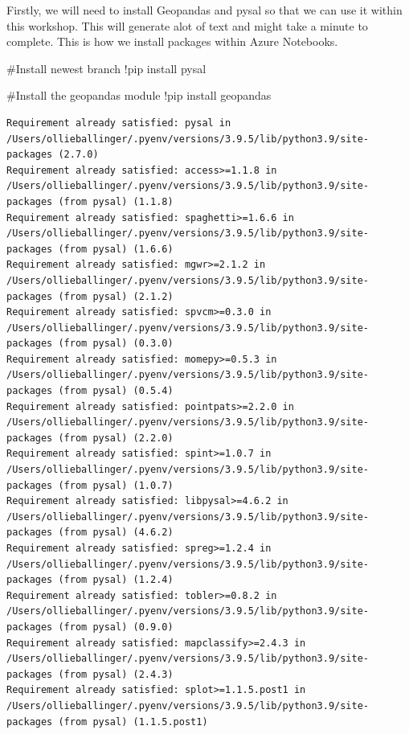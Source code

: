\documentclass[
  letterpaper,
  DIV=11,
  numbers=noendperiod]{scrreprt}
\newenvironment{Shaded}{\begin{snugshade}}{\end{snugshade}}
\newcommand{\CommentTok}[1]{\textcolor[rgb]{0.37,0.37,0.37}{#1}}
\newcommand{\NormalTok}[1]{\textcolor[rgb]{0.00,0.23,0.31}{#1}}
\newcommand{\OperatorTok}[1]{\textcolor[rgb]{0.37,0.37,0.37}{#1}}
\begin{document}
Firstly, we will need to install Geopandas and pysal so that we can use
it within this workshop. This will generate alot of text and might take
a minute to complete. This is how we install packages within Azure
Notebooks.

\begin{Shaded}
\begin{Highlighting}[]
\CommentTok{\#Install newest branch}
\OperatorTok{!}\NormalTok{pip install pysal}

\CommentTok{\#Install the geopandas module}
\OperatorTok{!}\NormalTok{pip install geopandas}
\end{Highlighting}
\end{Shaded}

\begin{verbatim}
Requirement already satisfied: pysal in /Users/ollieballinger/.pyenv/versions/3.9.5/lib/python3.9/site-packages (2.7.0)
Requirement already satisfied: access>=1.1.8 in /Users/ollieballinger/.pyenv/versions/3.9.5/lib/python3.9/site-packages (from pysal) (1.1.8)
Requirement already satisfied: spaghetti>=1.6.6 in /Users/ollieballinger/.pyenv/versions/3.9.5/lib/python3.9/site-packages (from pysal) (1.6.6)
Requirement already satisfied: mgwr>=2.1.2 in /Users/ollieballinger/.pyenv/versions/3.9.5/lib/python3.9/site-packages (from pysal) (2.1.2)
Requirement already satisfied: spvcm>=0.3.0 in /Users/ollieballinger/.pyenv/versions/3.9.5/lib/python3.9/site-packages (from pysal) (0.3.0)
Requirement already satisfied: momepy>=0.5.3 in /Users/ollieballinger/.pyenv/versions/3.9.5/lib/python3.9/site-packages (from pysal) (0.5.4)
Requirement already satisfied: pointpats>=2.2.0 in /Users/ollieballinger/.pyenv/versions/3.9.5/lib/python3.9/site-packages (from pysal) (2.2.0)
Requirement already satisfied: spint>=1.0.7 in /Users/ollieballinger/.pyenv/versions/3.9.5/lib/python3.9/site-packages (from pysal) (1.0.7)
Requirement already satisfied: libpysal>=4.6.2 in /Users/ollieballinger/.pyenv/versions/3.9.5/lib/python3.9/site-packages (from pysal) (4.6.2)
Requirement already satisfied: spreg>=1.2.4 in /Users/ollieballinger/.pyenv/versions/3.9.5/lib/python3.9/site-packages (from pysal) (1.2.4)
Requirement already satisfied: tobler>=0.8.2 in /Users/ollieballinger/.pyenv/versions/3.9.5/lib/python3.9/site-packages (from pysal) (0.9.0)
Requirement already satisfied: mapclassify>=2.4.3 in /Users/ollieballinger/.pyenv/versions/3.9.5/lib/python3.9/site-packages (from pysal) (2.4.3)
Requirement already satisfied: splot>=1.1.5.post1 in /Users/ollieballinger/.pyenv/versions/3.9.5/lib/python3.9/site-packages (from pysal) (1.1.5.post1)

\end{verbatim}
\end{document}

